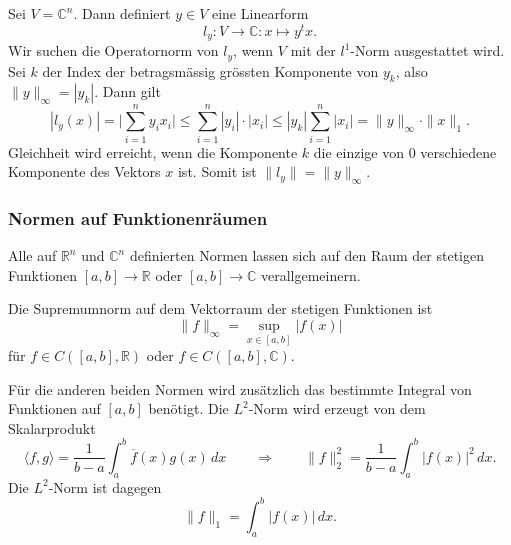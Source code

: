 \begin{beispiel}
Sei $V=\mathbb{C}^n$. 
Dann definiert $y\in V$ eine Linearform
\[
l_y
\colon
V\to \mathbb C
:
x\mapsto y^tx.
\]
Wir suchen  die Operatornorm von $l_y$, wenn $V$ mit der $l^1$-Norm
ausgestattet wird.
Sei $k$ der Index der betragsmässig grössten Komponente von $y_k$,
also $\| y\|_\infty = |y_k|$.
Dann gilt
\[
|l_y(x)|
=
\biggl|\sum_{i=1}^n y_ix_i\biggr|
\le
\sum_{i=1}^n |y_i|\cdot |x_i|
\le
|y_k| \sum_{i=1}^n |x_i|
=
\|y\|_\infty\cdot \|x\|_1.
\]
Gleichheit wird erreicht, wenn die Komponente $k$ die einzige
von $0$ verschiedene Komponente des Vektors $x$ ist.
Somit ist $\|l_y\| = \|y\|_\infty$.
\end{beispiel}


\subsubsection{Normen auf Funktionenräumen}
Alle auf $\mathbb{R}^n$ und $\mathbb{C}^n$ definierten Normen lassen
sich auf den Raum der stetigen Funktionen $[a,b]\to\mathbb{R}$ oder
$[a,b]\to\mathbb{C}$ verallgemeinern.

Die Supremumnorm auf dem Vektorraum der stetigen Funktionen ist
\[
\|f\|_\infty = \sup_{x\in[a,b]} |f(x)|
\]
für $f\in C([a,b],\mathbb{R})$ oder $f\in C([a,b],\mathbb{C})$.

Für die anderen beiden Normen wird zusätzlich das bestimmte Integral
von Funktionen auf $[a,b]$ benötigt.
Die $L^2$-Norm wird erzeugt von dem Skalarprodukt
\[
\langle f,g\rangle
=
\frac{1}{b-a}
\int_a^b \overline{f}(x)g(x)\,dx
\qquad\Rightarrow\qquad
\|f\|_2^2 = \frac{1}{b-a}\int_a^b |f(x)|^2\,dx.
\]
Die $L^2$-Norm ist dagegen
\[
\|f\|_1
=
\int_a^b |f(x)|\,dx.
\]

